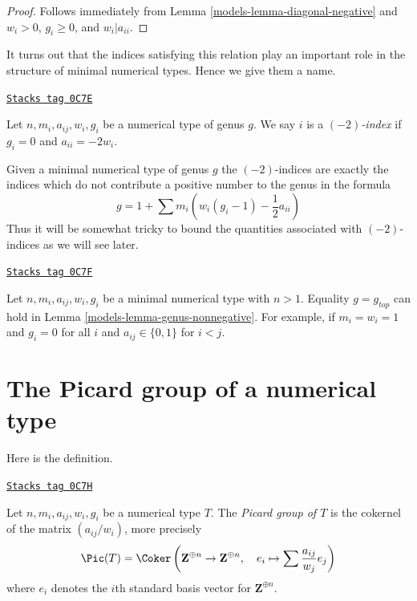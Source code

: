 \begin{proof}

Follows immediately from Lemma \ref{models-lemma-diagonal-negative} and
$w_i > 0$, $g_i \geq 0$, and $w_i | a_{ii}$.
\end{proof}

It turns out that the indices satisfying this relation play an
important role in the structure of minimal numerical types.
Hence we give them a name.

\begin{definition}
\label{models-definition-type-minus-two}
\href{https://stacks.math.columbia.edu/tag/0C7E}{\texttt{Stacks tag 0C7E}}

Let $n, m_i, a_{ij}, w_i, g_i$ be a numerical type of genus $g$.
We say $i$ is a {\it $(-2)$-index} if $g_i = 0$ and $a_{ii} = -2w_i$.
\end{definition}

Given a minimal numerical type of genus $g$ the $(-2)$-indices
are exactly the indices which do not contribute a positive number
to the genus in the formula
$$
g = 1 + \sum m_i(w_i(g_i - 1) - \frac{1}{2} a_{ii})
$$
Thus it will be somewhat tricky to bound the quantities associated
with $(-2)$-indices as we will see later.

\begin{remark}
\label{models-remark-genus-equality}
\href{https://stacks.math.columbia.edu/tag/0C7F}{\texttt{Stacks tag 0C7F}}

Let $n, m_i, a_{ij}, w_i, g_i$ be a minimal numerical type with $n > 1$.
Equality $g = g_{top}$ can hold in Lemma \ref{models-lemma-genus-nonnegative}.
For example, if $m_i = w_i = 1$ and $g_i = 0$ for all $i$ and
$a_{ij} \in \{0, 1\}$ for $i < j$.
\end{remark}

\section{The Picard group of a numerical type}
\label{models-section-picard-group}
Here is the definition.

\begin{definition}
\label{models-definition-picard-group}
\href{https://stacks.math.columbia.edu/tag/0C7H}{\texttt{Stacks tag 0C7H}}

Let $n, m_i, a_{ij}, w_i, g_i$ be a numerical type $T$. The
{\it Picard group of $T$} is the cokernel of the matrix
$(a_{ij}/w_i)$, more precisely
$$
\Pic(T) =
\Coker\left(
\mathbf{Z}^{\oplus n} \to \mathbf{Z}^{\oplus n},\quad
e_i
\mapsto
\sum \frac{a_{ij}}{w_j}e_j
\right)
$$
where $e_i$ denotes the $i$th standard basis vector for $\mathbf{Z}^{\oplus n}$.
\end{definition}

